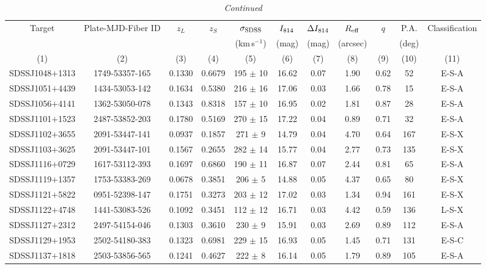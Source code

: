 \documentclass{emulateapj}
\begin{document}
\begin{table*}[htbp]
\begin{center}
\caption{\textit{Continued}}
\begin{tabular}{c c c c c c c c c c c}
\hline \hline
Target & Plate-MJD-Fiber ID & $z_{L}$ & $z_{S}$ & $\sigma_{\rm SDSS}$ & $I_{\rm 814}$ & $\Delta I_{\rm 814}$ & $R_{\rm eff}$ & $q$ & P.A. & Classification \\
 & & & & (km\,s$^{-1}$) & (mag) & (mag) & (arcsec) & & (deg) & \\
(1) & (2) & (3) & (4) & (5) & (6) & (7) & (8) & (9) & (10) & (11) \\
\hline
SDSSJ1048$+$1313 & 1749-53357-165 & 0.1330 & 0.6679 & 195 $\pm$   10 & 16.62 & 0.07 & 1.90 & 0.62 & 52 & E-S-A \\ 
SDSSJ1051$+$4439 & 1434-53053-142 & 0.1634 & 0.5380 & 216 $\pm$   16 & 17.06 & 0.03 & 1.66 & 0.78 & 15 & E-S-A \\ 
SDSSJ1056$+$4141 & 1362-53050-078 & 0.1343 & 0.8318 & 157 $\pm$   10 & 16.95 & 0.02 & 1.81 & 0.87 & 28 & E-S-A \\ 
SDSSJ1101$+$1523 & 2487-53852-203 & 0.1780 & 0.5169 & 270 $\pm$   15 & 17.22 & 0.04 & 0.89 & 0.71 & 32 & E-S-A \\ 
SDSSJ1102$+$3655 & 2091-53447-141 & 0.0937 & 0.1857 & 271 $\pm$    9 & 14.79 & 0.04 & 4.70 & 0.64 & 167 & E-S-X \\ 
SDSSJ1103$+$3625 & 2091-53447-101 & 0.1567 & 0.2655 & 282 $\pm$   14 & 15.77 & 0.04 & 2.77 & 0.73 & 135 & E-S-X \\ 
SDSSJ1116$+$0729 & 1617-53112-393 & 0.1697 & 0.6860 & 190 $\pm$   11 & 16.87 & 0.07 & 2.44 & 0.81 & 65 & E-S-A \\ 
SDSSJ1119$+$1357 & 1753-53383-269 & 0.0678 & 0.3851 & 206 $\pm$    5 & 14.88 & 0.05 & 4.37 & 0.65 & 80 & E-S-X \\ 
SDSSJ1121$+$5822 & 0951-52398-147 & 0.1751 & 0.3273 & 203 $\pm$   12 & 17.02 & 0.03 & 1.34 & 0.94 & 161 & E-S-X \\ 
SDSSJ1122$+$4748 & 1441-53083-526 & 0.1092 & 0.3451 & 112 $\pm$   12 & 16.71 & 0.03 & 4.42 & 0.59 & 136 & L-S-X \\ 
SDSSJ1127$+$2312 & 2497-54154-046 & 0.1303 & 0.3610 & 230 $\pm$    9 & 15.91 & 0.03 & 2.69 & 0.89 & 112 & E-S-A \\ 
SDSSJ1129$+$1953 & 2502-54180-383 & 0.1323 & 0.6981 & 229 $\pm$   15 & 16.93 & 0.05 & 1.45 & 0.71 & 131 & E-S-C \\ 
SDSSJ1137$+$1818 & 2503-53856-565 & 0.1241 & 0.4627 & 222 $\pm$    8 & 16.14 & 0.05 & 1.79 & 0.89 & 105 & E-S-A \\ 

\end{tabular}
\end{center}
\end{table*}
\end{document}

